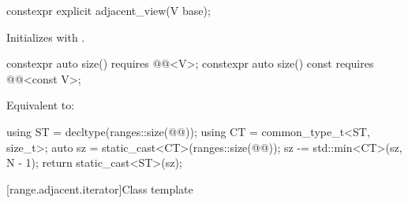 \begin{itemdecl}
constexpr explicit adjacent_view(V base);
\end{itemdecl}

\begin{itemdescr}
\pnum
\effects
Initializes  with .
\end{itemdescr}

\begin{itemdecl}
constexpr auto size() requires @@<V>;
constexpr auto size() const requires @@<const V>;
\end{itemdecl}

\begin{itemdescr}
\pnum
\effects
Equivalent to:
\begin{codeblock}
using ST = decltype(ranges::size(@@));
using CT = common_type_t<ST, size_t>;
auto sz = static_cast<CT>(ranges::size(@@));
sz -= std::min<CT>(sz, N - 1);
return static_cast<ST>(sz);
\end{codeblock}
\end{itemdescr}

[range.adjacent.iterator]{Class template }

